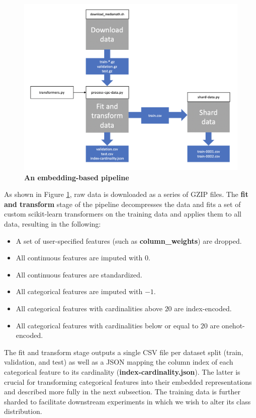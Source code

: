 \documentclass{proc}
\begin{document}
\begin{figure}[h!]
		\includegraphics*[scale=0.4]{../figures/memory-based-pipeline.png}
		\caption{\textbf{An embedding-based pipeline}}
		\label{fig:memory-based-pipeline}
\end{figure}

As shown in Figure \ref{fig:memory-based-pipeline}, raw data is downloaded as a series of GZIP files. The \textbf{fit and transform} stage of the pipeline decompresses the data and fits a set of custom scikit-learn transformers on the training data and applies them to all data, resulting in the following:

\begin{itemize}
\item{A set of user-specified features (such as \textbf{column\_weights}) are dropped.}
\item{All continuous features are imputed with $0$.}
\item{All continuous features are standardized.}
\item{All categorical features are imputed with $-1$.}
\item{All categorical features with cardinalities above $20$ are index-encoded.}
\item{All categorical features with cardinalities below or equal to $20$ are onehot-encoded.}
\end{itemize}

The fit and transform stage outputs a single CSV file per dataset split (train, validation, and test) as well as a JSON mapping the column index of each categorical feature to its cardinality (\textbf{index-cardinality.json}). The latter is crucial for transforming categorical features into their embedded representations and described more fully in the next subsection. The training data is further sharded to facilitate downstream experiments in which we wish to alter its class distribution.
\end{document}
